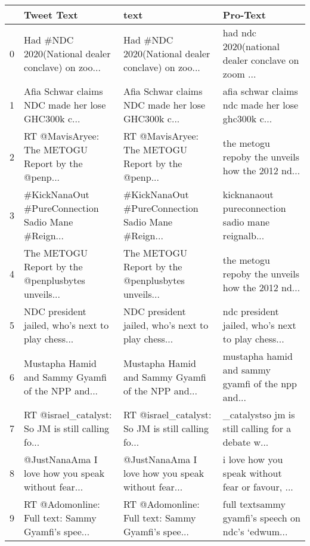 \begin{tabular}{llll}
\toprule
{} &                                         Tweet Text &                                               text &                                           Pro-Text \\
\midrule
0 &  Had \#NDC 2020(National dealer conclave) on zoo... &  Had \#NDC 2020(National dealer conclave) on zoo... &  had ndc 2020(national dealer conclave on zoom ... \\
1 &  Afia Schwar claims NDC made her lose GHC300k c... &  Afia Schwar claims NDC made her lose GHC300k c... &  afia schwar claims ndc made her lose ghc300k c... \\
2 &  RT @MavisAryee: The METOGU Report by the @penp... &  RT @MavisAryee: The METOGU Report by the @penp... &  the metogu repoby the  unveils how the 2012 nd... \\
3 &  \#KickNanaOut \#PureConnection Sadio Mane \#Reign... &  \#KickNanaOut \#PureConnection Sadio Mane \#Reign... &  kicknanaout pureconnection sadio mane reignalb... \\
4 &  The METOGU Report by the @penplusbytes unveils... &  The METOGU Report by the @penplusbytes unveils... &  the metogu repoby the  unveils how the 2012 nd... \\
5 &  NDC president jailed, who’s next to play chess... &  NDC president jailed, who’s next to play chess... &  ndc president jailed, who’s next to play chess... \\
6 &  Mustapha Hamid and Sammy Gyamfi of the NPP and... &  Mustapha Hamid and Sammy Gyamfi of the NPP and... &  mustapha hamid and sammy gyamfi of the npp and... \\
7 &  RT @israel\_catalyst: So JM is still calling fo... &  RT @israel\_catalyst: So JM is still calling fo... &  \_catalystso jm is still calling for a debate w... \\
8 &  @JustNanaAma I love how you speak without fear... &  @JustNanaAma I love how you speak without fear... &   i love how you speak without fear or favour, ... \\
9 &  RT @Adomonline: Full text: Sammy Gyamfi’s spee... &  RT @Adomonline: Full text: Sammy Gyamfi’s spee... &  full textsammy gyamfi’s speech on ndc’s ‘edwum... \\
\bottomrule
\end{tabular}

